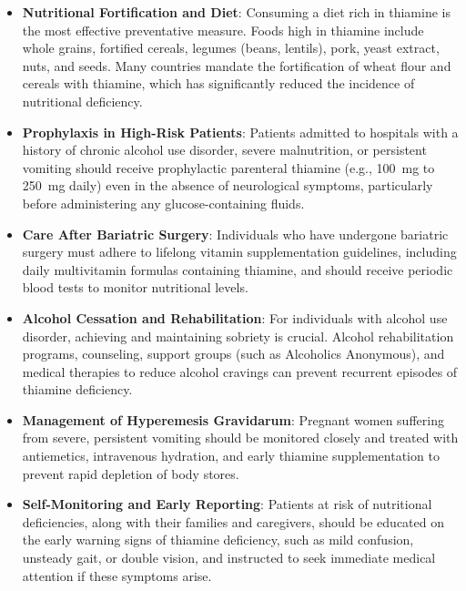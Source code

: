 \begin{itemize}
    \item \textbf{Nutritional Fortification and Diet}: Consuming a diet rich in thiamine is the most effective preventative measure. Foods high in thiamine include whole grains, fortified cereals, legumes (beans, lentils), pork, yeast extract, nuts, and seeds. Many countries mandate the fortification of wheat flour and cereals with thiamine, which has significantly reduced the incidence of nutritional deficiency.
    \item \textbf{Prophylaxis in High-Risk Patients}: Patients admitted to hospitals with a history of chronic alcohol use disorder, severe malnutrition, or persistent vomiting should receive prophylactic parenteral thiamine (e.g., 100~mg to 250~mg daily) even in the absence of neurological symptoms, particularly before administering any glucose-containing fluids.
    \item \textbf{Care After Bariatric Surgery}: Individuals who have undergone bariatric surgery must adhere to lifelong vitamin supplementation guidelines, including daily multivitamin formulas containing thiamine, and should receive periodic blood tests to monitor nutritional levels.
    \item \textbf{Alcohol Cessation and Rehabilitation}: For individuals with alcohol use disorder, achieving and maintaining sobriety is crucial. Alcohol rehabilitation programs, counseling, support groups (such as Alcoholics Anonymous), and medical therapies to reduce alcohol cravings can prevent recurrent episodes of thiamine deficiency.
    \item \textbf{Management of Hyperemesis Gravidarum}: Pregnant women suffering from severe, persistent vomiting should be monitored closely and treated with antiemetics, intravenous hydration, and early thiamine supplementation to prevent rapid depletion of body stores.
    \item \textbf{Self-Monitoring and Early Reporting}: Patients at risk of nutritional deficiencies, along with their families and caregivers, should be educated on the early warning signs of thiamine deficiency, such as mild confusion, unsteady gait, or double vision, and instructed to seek immediate medical attention if these symptoms arise.
\end{itemize}

